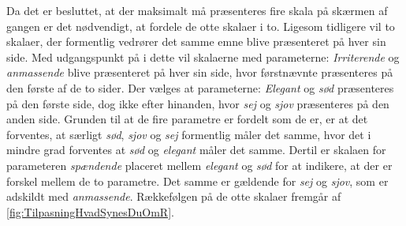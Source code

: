 Da det er besluttet, at der maksimalt må præsenteres fire skala på skærmen af gangen er det nødvendigt, at fordele de otte skalaer i to. Ligesom tidligere vil to skalaer, der formentlig vedrører det samme emne blive præsenteret på hver sin side. Med udgangspunkt på i dette vil skalaerne med parameterne: \textit{Irriterende} og \textit{anmassende} blive præsenteret på hver sin side, hvor førstnævnte præsenteres på den første af de to sider. Der vælges at parameterne: \textit{Elegant} og \textit{sød} præsenteres på den første side, dog ikke efter hinanden, hvor \textit{sej} og \textit{sjov} præsenteres på den anden side. Grunden til at de fire parametre er fordelt som de er, er at det forventes, at særligt \textit{sød}, \textit{sjov} og \textit{sej} formentlig måler det samme, hvor det i mindre grad forventes at \textit{sød} og \textit{elegant} måler det samme. Dertil er skalaen for parameteren \textit{spændende} placeret mellem \textit{elegant} og \textit{sød} for at indikere, at der er forskel mellem de to parametre. Det samme er gældende for \textit{sej} og \textit{sjov}, som er adskildt med \textit{anmassende}. Rækkefølgen på de otte skalaer fremgår af \autoref{fig:TilpasningHvadSynesDuOmR}.
\newpage
%

